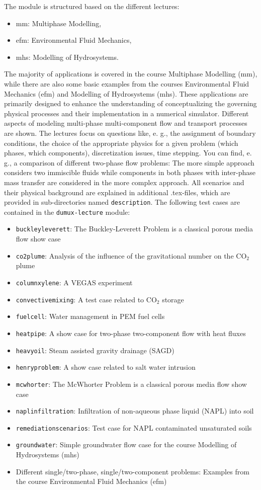 The module is structured based on the different lectures:
\begin{itemize}
\item mm: Multiphase Modelling,
\item efm: Environmental Fluid Mechanics,
\item mhs: Modelling of Hydrosystems.
\end{itemize}
The majority of applications is covered in the course Multiphase Modelling (mm),
while there are also some basic examples from the
courses Environmental Fluid Mechanics (efm) and Modelling of Hydrosystems (mhs).
These applications are primarily designed to enhance the understanding of conceptualizing the
governing physical processes and their implementation in a numerical simulator.
Different aspects of modeling multi-phase multi-component flow and transport processes are shown.
The lectures focus on questions like, e. g., the assignment of boundary conditions, the choice of the
appropriate physics for a given problem (which phases, which components), discretization issues,
time stepping. You can find, e. g., a comparison of different two-phase flow problems: The
more simple approach considers two immiscible fluids while components in both phases with inter-phase
mass transfer are considered in the more complex approach.
All scenarios and their physical background are explained in additional .tex-files,
which are provided in sub-directories named \texttt{description}. The following test cases are
contained in the \texttt{dumux-lecture} module:
\begin{itemize}
\item \texttt{buckleyleverett}: The Buckley-Leverett Problem is a classical porous media flow show case
\item \texttt{co2plume}: Analysis of the influence of the gravitational number on the $\text{CO}_2$ plume
\item \texttt{columnxylene}: A VEGAS experiment
\item \texttt{convectivemixing}: A test case related to CO$_2$ storage
\item \texttt{fuelcell}: Water management in PEM fuel cells 
\item \texttt{heatpipe}: A show case for two-phase two-component flow with heat fluxes
\item \texttt{heavyoil}: Steam assisted gravity drainage (SAGD)
\item \texttt{henryproblem}: A show case related to salt water intrusion
\item \texttt{mcwhorter}: The McWhorter Problem is a classical porous media flow show case
\item \texttt{naplinfiltration}: Infiltration of non-aqueous phase liquid (NAPL) into soil
\item \texttt{remediationscenarios}: Test case for NAPL contaminated unsaturated soils
\item \texttt{groundwater}: Simple groundwater flow case for the course Modelling of Hydrosystems (mhs)
\item Different single/two-phase, single/two-component problems: Examples from the course Environmental Fluid Mechanics (efm)
\end{itemize}
